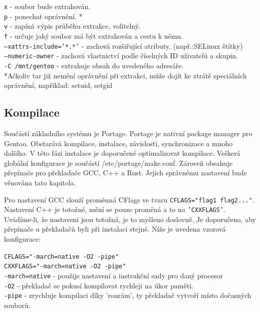 \documentclass[12pt,a4paper,twoside,]{article}
\begin{document}
{\hspace*{-1.5em}\texttt{x} - soubor bude extrahován.\\
\texttt{p} - ponechat oprávnění. *\\
\texttt{v} - zapíná výpis průběhu extrakce, volitelný.\\
\texttt{f} - určuje jaký soubor má být extrahován a cestu k němu.\\
\texttt{--xattrs-include='*.*'} - zachová rozšiřující atributy.
(např.:SELinux štítky)\\
\texttt{--numeric-owner} - zachová vlastnictví podle číselných ID uživatelů a
skupin.\\
\texttt{-C /mnt/gentoo} - extrahuje obsah do uvedeného adresáře.\\

\hspace*{-1.5em}*Ačkoliv tar již nemění oprávnění při extrakci, může dojít ke
ztrátě speciálních oprávnění, například: setuid, setgid

\newpage
\subsection{Kompilace}
Součástí základního systému je Portage. Portage je nativní package manager pro Gentoo.
Obstarává kompilace, instalace, závislosti, synchronizace a mnoho dalšího. V této fázi instalace
je doporučené optimalizovat kompilace. Veškerá globální konfigurace je součástí /etc/portage/make.conf.
Zároveň obsahuje přepínače pro překladače GCC, C++ a Rust. Jejich správnému nastavení bude věnována tato kapitola.

\hspace*{-1.5em}Pro nastavení GCC slouží proměnná CFlags ve tvaru \texttt{CFLAGS="flag1 flag2..."}. Nastavení C++ je totožné, mění se pouze proměná a to na \texttt{'CXXFLAGS'}.
Uvádíme-li, že nastavení jsou totožná, je to myšleno doslovně. Je doporučeno, aby přepínače u překladačů byli při instalaci stejné. Níže je uvedena
vzorová konfigurace:

\hspace*{-1.5em}\texttt{CFLAGS="-march=native -O2 -pipe"}\\
\texttt{CXXFLAGS="-march=native -O2 -pipe"}\\

\hspace*{-1.5em}\texttt{-march=native} - použije nastavení a instrukční sady pro daný procesor\\
\texttt{-O2} - překladač se pokusí kompilovat rychleji na úkor paměti.\\
\texttt{-pipe} - zrychluje kompilaci díky 'rourám', ty překladač vytvoří místo dočasných souborů.\\

}
\end{document}
